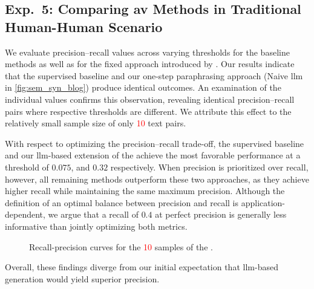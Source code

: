 \subsection{Exp.\ 5: Comparing \acs{av} Methods in Traditional Human-Human Scenario}
\label{subsec:imp_gen_res}

We evaluate precision–recall values across varying thresholds for the baseline methods as well as for the fixed approach introduced by \citet{koppel_determining_2014}.
Our results indicate that the supervised baseline and our one-step paraphrasing approach (Naive \ac{llm} in \autoref{fig:sem_syn_blog}) produce identical outcomes.
An examination of the individual values confirms this observation, revealing identical precision–recall pairs where respective thresholds are different.
We attribute this effect to the relatively small sample size of only \textcolor{red}{10} text pairs.

With respect to optimizing the precision–recall trade-off, the supervised baseline and our \ac{llm}-based extension of the \impAppr{} achieve the most favorable performance at a threshold of $0.075$, and $0.32$ respectively.
When precision is prioritized over recall, however, all remaining methods outperform these two approaches, as they achieve higher recall while maintaining the same maximum precision.
Although the definition of an optimal balance between precision and recall is application-dependent, we argue that a recall of $0.4$ at perfect precision is generally less informative than jointly optimizing both metrics.

\begin{figure}[htbp]
    \centering
    
    \caption[Recall-precision curves for the \dataStudent{}.]{Recall-precision curves for the \textcolor{red}{10} samples of the \dataStudent{}.}
    \label{fig:sem_syn_blog}
\end{figure}

Overall, these findings diverge from our initial expectation that \ac{llm}-based \imp{} generation would yield superior precision.
